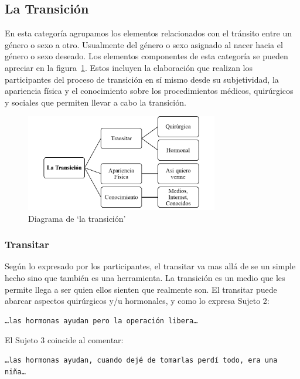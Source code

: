 \subsection{La Transición}

En esta categoría agrupamos los elementos relacionados con el tránsito entre un
género o sexo a otro. Usualmente del género o sexo asignado al nacer hacia el
género o sexo deseado. Los elementos componentes de esta categoría se pueden
apreciar en la figura~\ref{fig:transicion}. Estos incluyen la elaboración que
realizan los participantes del proceso de transición en sí mismo desde su
subjetividad, la apariencia física y el conocimiento sobre los procedimientos
médicos, quirúrgicos y sociales que permiten llevar a cabo la transición.

\begin{figure}
    \centering
    \includegraphics[width=0.75\textwidth]{transicion}
    \caption{Diagrama de ‘la transición’}\label{fig:transicion}
\end{figure}

\subsubsection{Transitar}

Según lo expresado por los participantes, el transitar va mas allá de se un
simple hecho sino que también es una herramienta. La transición es un medio que
les permite llega a ser quien ellos sienten que realmente son. El transitar
puede abarcar aspectos quirúrgicos y/u hormonales, y como lo expresa Sujeto 2:

\begin{verbatim}
…las hormonas ayudan pero la operación libera…
\end{verbatim}

El Sujeto 3 coincide al comentar:

\begin{verbatim}
…las hormonas ayudan, cuando dejé de tomarlas perdí todo, era una niña…
\end{verbatim}

